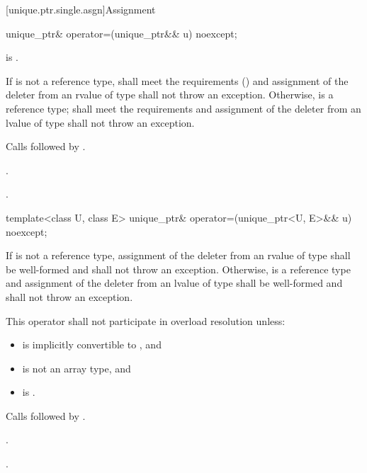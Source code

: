 [unique.ptr.single.asgn]{Assignment}

%
\begin{itemdecl}
unique_ptr& operator=(unique_ptr&& u) noexcept;
\end{itemdecl}

\begin{itemdescr}
\pnum
\constraints
{} is .

\pnum
\requires If  is not a reference type,  shall meet the
 requirements () and assignment
of the deleter from an rvalue of type  shall not throw an exception.
Otherwise,  is a reference type;
 shall meet the 
requirements and assignment of the deleter from an
lvalue of type  shall not throw an exception.

\pnum
\effects
Calls  followed by
.

\pnum
\returns
{}.

\pnum
\ensures
{}.
\end{itemdescr}

%
\begin{itemdecl}
template<class U, class E> unique_ptr& operator=(unique_ptr<U, E>&& u) noexcept;
\end{itemdecl}

\begin{itemdescr}
\pnum
\requires If  is not a reference type, assignment of the deleter from
an rvalue of type  shall be well-formed and shall not throw an exception.
Otherwise,  is a reference type and assignment of the deleter from an lvalue
of type  shall be well-formed and shall not throw an exception.

\pnum
\remarks
This operator shall not participate in overload resolution unless:
\begin{itemize}
\item {} is implicitly convertible to , and
\item {} is not an array type, and
\item {} is .
\end{itemize}

\pnum
\effects
Calls  followed by
.

\pnum
\returns
{}.

\pnum
\ensures
{}.
\end{itemdescr}

